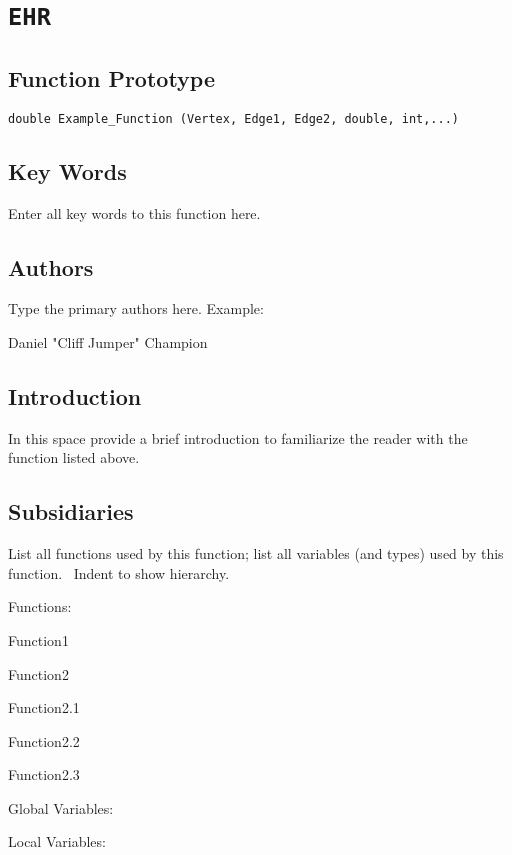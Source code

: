                       

\section*{\texttt{EHR}}

\subsection*{Function Prototype}

\texttt{double Example\_Function (Vertex, Edge1, Edge2, double, int,...)}

\subsection*{Key Words}

Enter all key words to this function here.

\subsection*{Authors}

Type the primary authors here. Example:

Daniel "Cliff Jumper" Champion

\subsection*{Introduction}

In this space provide a brief introduction to familiarize the reader with
the function listed above. \ 

\subsection*{Subsidiaries}

List all functions used by this function; list all variables (and types)
used by this function. \ Indent to show hierarchy.

Functions:

\qquad Function1

\qquad Function2

\qquad\qquad Function2.1

\qquad\qquad Function2.2

\qquad\qquad\qquad Function2.3

Global Variables:

Local Variables:

